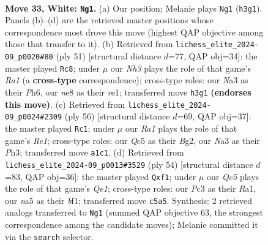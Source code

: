 \documentclass[11pt]{article}
\begin{document}
\clearpage

\begin{figure}[p]\centering
\begin{subfigure}{0.46\textwidth}\centering
\resizebox{\linewidth}{!}{%
\newchessgame
\chessboard[
  setfen={3qn2r/6k1/p4pp1/n1Q1p2p/P3P1b1/N1PP3N/B4PPP/R3K3 w - - 0 33},
  showmover=false,
  pgfstyle=straightmove, color=movearrow, markmove={h3-g1}
]}
\caption{}
\end{subfigure}\hfill
\begin{subfigure}{0.46\textwidth}\centering
\resizebox{\linewidth}{!}{%
\newchessgame
\chessboard[
  setfen={r5k1/2p1qp2/1p2nbpp/3Bp3/1P2P3/2P2NP1/2Q2PP1/4R1K1 b - - 0 26},
  showmover=false,
  pgfstyle=straightmove, color=movearrow, markmove={a8-c8}
]}
\caption{}
\end{subfigure}
\\[4pt]
\begin{subfigure}{0.46\textwidth}\centering
\resizebox{\linewidth}{!}{%
\newchessgame
\chessboard[
  setfen={4r1k1/pp1q1pp1/b6p/Q2p4/3NnPP1/1P2P2P/P5B1/4R1K1 w - - 5 29},
  showmover=false,
  pgfstyle=straightmove, color=movearrow, markmove={e1-c1}
]}
\caption{}
\end{subfigure}\hfill
\begin{subfigure}{0.46\textwidth}\centering
\resizebox{\linewidth}{!}{%
\newchessgame
\chessboard[
  setfen={5r1k/1p1q3n/p2p4/2pP1p2/P2b1B1P/2N2P2/1P5P/R3Qb1K w - - 0 28},
  showmover=false,
  pgfstyle=straightmove, color=movearrow, markmove={e1-f1}
]}
\caption{}
\end{subfigure}
\caption{\textbf{Move 33, White: \texttt{Ng1}.} (a) Our position; Melanie plays \texttt{Ng1} (\texttt{h3g1}). Panels (b)--(d) are the retrieved master positions whose correspondence most drove this move (highest QAP objective among those that transfer to it). (b) Retrieved from \texttt{lichess\_elite\_2024-09\_p0020\#80} (ply 51) [structural distance $d$=77, QAP obj=34]: the master played \texttt{Rc8}; under $\mu$ our \emph{Nh3} plays the role of that game's \emph{Ra1} (a \textbf{cross-type} correspondence); cross-type roles: our \emph{N}a3 as their \emph{P}h6, our \emph{n}e8 as their \emph{r}e1; transferred move \texttt{h3g1} \textbf{(endorses this move)}. (c) Retrieved from \texttt{lichess\_elite\_2024-09\_p0024\#2309} (ply 56) [structural distance $d$=69, QAP obj=37]: the master played \texttt{Rc1}; under $\mu$ our \emph{Ra1} plays the role of that game's \emph{Re1}; cross-type roles: our \emph{Q}c5 as their \emph{B}g2, our \emph{N}a3 as their \emph{P}h3; transferred move \texttt{a1c1}. (d) Retrieved from \texttt{lichess\_elite\_2024-09\_p0013\#3529} (ply 54) [structural distance $d$=83, QAP obj=36]: the master played \texttt{Qxf1}; under $\mu$ our \emph{Qc5} plays the role of that game's \emph{Qe1}; cross-type roles: our \emph{P}c3 as their \emph{R}a1, our \emph{n}a5 as their \emph{b}f1; transferred move \texttt{c5a5}. Synthesis: 2 retrieved analogs transferred to \texttt{Ng1} (summed QAP objective 63, the strongest correspondence among the candidate moves); Melanie committed it via the \texttt{search} selector.}
\label{fig:thought-m64}
\end{figure}
\end{document}
